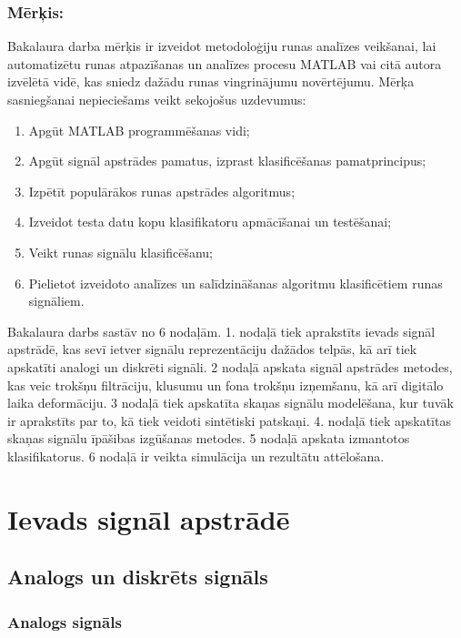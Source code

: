 \documentclass[12pt,paper=A4]{report}
\begin{document}
\subsection*{Mērķis:}
Bakalaura darba mērķis ir izveidot metodoloģiju runas analīzes veikšanai, lai automatizētu runas atpazīšanas un analīzes procesu MATLAB vai citā autora izvēlētā vidē, kas sniedz dažādu runas vingrinājumu novērtējumu. Mērķa sasniegšanai nepieciešams veikt sekojošus uzdevumus:
\begin{enumerate}
\item Apgūt MATLAB programmēšanas vidi;
\item Apgūt signāl apstrādes pamatus, izprast klasificēšanas pamatprincipus;
\item Izpētīt populārākos runas apstrādes algoritmus;
\item Izveidot testa datu kopu klasifikatoru apmācīšanai un testēšanai;
\item Veikt runas signālu klasificēšanu;
\item Pielietot izveidoto analīzes un salīdzināšanas algoritmu klasificētiem runas signāliem.
\end{enumerate}
Bakalaura darbs sastāv no 6 nodaļām. 1. nodaļā tiek aprakstīts ievads signāl apstrādē, kas sevī ietver signālu reprezentāciju dažādos telpās, kā arī tiek apskatīti analogi un diskrēti signāli. 2 nodaļā apskata signāl apstrādes metodes, kas veic trokšņu filtrāciju, klusumu un fona trokšņu izņemšanu, kā arī digitālo laika deformāciju. 3 nodaļā tiek apskatīta skaņas signālu modelēšana, kur tuvāk ir aprakstīts par to, kā tiek veidoti sintētiski patskaņi. 4. nodaļā tiek apskatītas skaņas signālu īpāšibas izgūšanas metodes. 5 nodaļā apskata izmantotos klasifikatorus. 6 nodaļā ir veikta simulācija un rezultātu attēlošana.

\chapter{Ievads signāl apstrādē}


\section{Analogs un diskrēts signāls}

\subsection{Analogs signāls}
\end{document}
